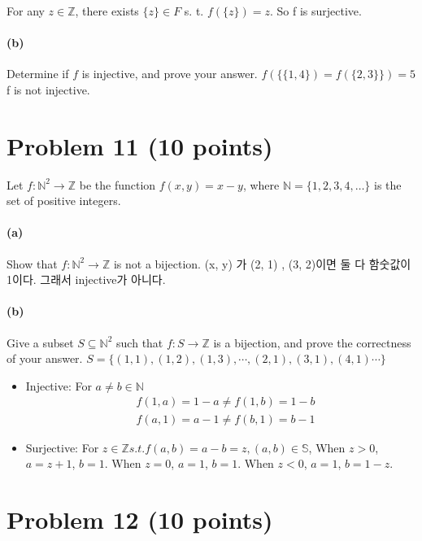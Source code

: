 \documentclass[english]{article}
\begin{document}
For any $z \in \mathbb {Z}$, there exists $\{z\} \in F$ s. t. $f(\{z\}) = z.$
So f is surjective.

\paragraph{(b)} Determine if $f$ is injective, and prove your answer.
$f(\{\{1, 4\}) = f( \{2, 3\}\}) = 5$
f is not injective.


\section*{Problem 11 (10 points)}

Let $f: \mathbb{N}^2 \to \mathbb{Z}$ be the function $f(x,y) = x-y$,
where $\mathbb{N} = \{1,2,3,4,\ldots\}$ is the set of positive integers.

\paragraph{(a)}
Show that $f: \mathbb{N}^2 \to \mathbb{Z}$ is not a bijection.
(x, y) 가 (2, 1) , (3, 2)이면 둘 다 함숫값이 1이다. 그래서 injective가 아니다.

\paragraph{(b)}
Give a subset $S \subseteq\mathbb{N}^2$ such that
$f: S \to \mathbb{Z}$ is a bijection, and prove the
correctness of your answer.
$ S = \{(1, 1), (1, 2), (1, 3), \cdots, (2, 1), (3, 1), (4, 1) \cdots \} $
\begin{itemize}
  \item Injective:
   For $a \neq b \in \mathbb{N} $
   \begin{align}
    & f(1, a) = 1 -a \neq f(1, b) = 1 - b \\
    & f(a, 1) = a - 1 \neq f(b, 1) = b - 1
   \end{align}
  \item Surjective:
   For $z \in \mathbb{Z}  s. t. f(a, b) = a -b = z, (a, b) \in \mathbb{S}$, When $z > 0$, $a = z+1$, $b = 1$. When $z = 0$, $a = 1$, $b = 1$. When  $z < 0$, $a = 1$, $b = 1 - z$.

\end{itemize}

\section*{Problem 12 (10 points)}
\end{document}
